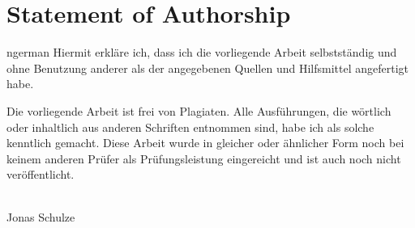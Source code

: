 \thispagestyle{empty}
\vspace*{\fill}
\section*{Statement of Authorship}

\begin{foreignlanguage}{ngerman}
Hiermit erkläre ich, dass ich die vorliegende Arbeit selbstständig und ohne
Benutzung anderer als der angegebenen Quellen und Hilfsmittel angefertigt habe.

Die vorliegende Arbeit ist frei von Plagiaten.
Alle Ausführungen, die wörtlich oder inhaltlich aus anderen Schriften entnommen sind,
habe ich als solche kenntlich gemacht.
Diese Arbeit wurde in gleicher oder ähnlicher Form noch bei keinem anderen
Prüfer als Prüfungsleistung eingereicht und ist auch noch nicht veröffentlicht.

\vspace*{3cm}
\noindent
\parbox{5cm}{\centering\footnotesize\dotfill\\Jonas Schulze}
\end{foreignlanguage}
